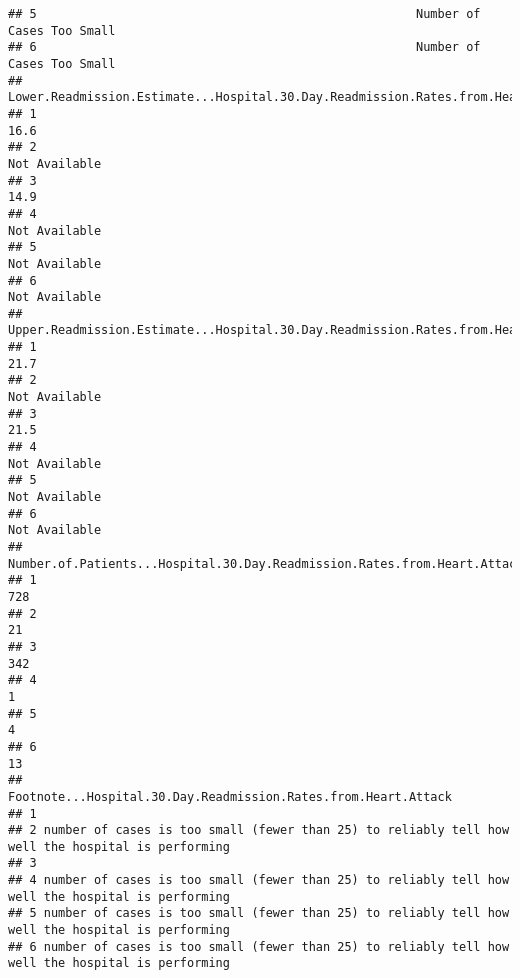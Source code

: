 \documentclass[]{article}
\begin{document}
\begin{verbatim}
## 5                                                     Number of Cases Too Small
## 6                                                     Number of Cases Too Small
##   Lower.Readmission.Estimate...Hospital.30.Day.Readmission.Rates.from.Heart.Attack
## 1                                                                             16.6
## 2                                                                    Not Available
## 3                                                                             14.9
## 4                                                                    Not Available
## 5                                                                    Not Available
## 6                                                                    Not Available
##   Upper.Readmission.Estimate...Hospital.30.Day.Readmission.Rates.from.Heart.Attack
## 1                                                                             21.7
## 2                                                                    Not Available
## 3                                                                             21.5
## 4                                                                    Not Available
## 5                                                                    Not Available
## 6                                                                    Not Available
##   Number.of.Patients...Hospital.30.Day.Readmission.Rates.from.Heart.Attack
## 1                                                                      728
## 2                                                                       21
## 3                                                                      342
## 4                                                                        1
## 5                                                                        4
## 6                                                                       13
##                                      Footnote...Hospital.30.Day.Readmission.Rates.from.Heart.Attack
## 1                                                                                                  
## 2 number of cases is too small (fewer than 25) to reliably tell how well the hospital is performing
## 3                                                                                                  
## 4 number of cases is too small (fewer than 25) to reliably tell how well the hospital is performing
## 5 number of cases is too small (fewer than 25) to reliably tell how well the hospital is performing
## 6 number of cases is too small (fewer than 25) to reliably tell how well the hospital is performing

\end{verbatim}
\end{document}

